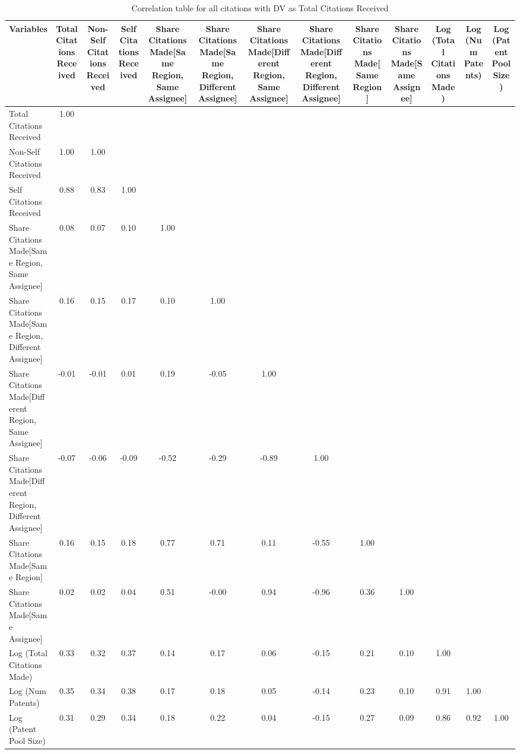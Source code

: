 \begin{table}[htbp]\centering \caption{Correlation table for all citations with DV as Total Citations Received\label{a.e.o.t.n.tcorrelation}}
\begin{tabular}{l  c  c  c  c  c  c  c  c  c  c  c  c }\hline\hline
\multicolumn{1}{c}{Variables} &Total Citations Received&Non-Self Citations Received&Self Citations Received&Share Citations Made[Same Region, Same Assignee]&Share Citations Made[Same Region, Different Assignee]&Share Citations Made[Different Region, Same Assignee]&Share Citations Made[Different Region, Different Assignee]&Share Citations Made[Same Region]&Share Citations Made[Same Assignee]&Log (Total Citations Made)&Log (Num Patents)&Log (Patent Pool Size)\\ \hline
Total Citations Received&1.00\\
Non-Self Citations Received&1.00&1.00\\
Self Citations Received&0.88&0.83&1.00\\
Share Citations Made[Same Region, Same Assignee]&0.08&0.07&0.10&1.00\\
Share Citations Made[Same Region, Different Assignee]&0.16&0.15&0.17&0.10&1.00\\
Share Citations Made[Different Region, Same Assignee]&-0.01&-0.01&0.01&0.19&-0.05&1.00\\
Share Citations Made[Different Region, Different Assignee]&-0.07&-0.06&-0.09&-0.52&-0.29&-0.89&1.00\\
Share Citations Made[Same Region]&0.16&0.15&0.18&0.77&0.71&0.11&-0.55&1.00\\
Share Citations Made[Same Assignee]&0.02&0.02&0.04&0.51&-0.00&0.94&-0.96&0.36&1.00\\
Log (Total Citations Made)&0.33&0.32&0.37&0.14&0.17&0.06&-0.15&0.21&0.10&1.00\\
Log (Num Patents)&0.35&0.34&0.38&0.17&0.18&0.05&-0.14&0.23&0.10&0.91&1.00\\
Log (Patent Pool Size)&0.31&0.29&0.34&0.18&0.22&0.04&-0.15&0.27&0.09&0.86&0.92&1.00\\
\hline \hline 
 \end{tabular}
\end{table}
